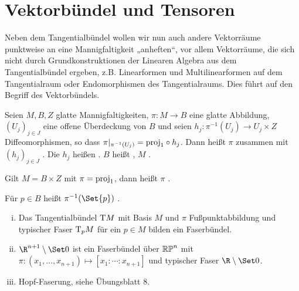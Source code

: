 \chapter{Vektorbündel und Tensoren}


Neben dem Tangentialbündel wollen wir nun auch andere Vektorräume punktweise an eine Mannigfaltigkeit „anheften“, vor allem Vektorräume, die sich nicht durch Grundkonstruktionen der Linearen Algebra aus dem Tangentialbündel ergeben, z.B. Linearformen und Multilinearformen auf dem Tangentialraum oder Endomorphismen des Tangentialraums.
Dies führt auf den Begriff des Vektorbündels.

\begin{df}[Faserbündel] \label{5.1}
    Seien $M, B, Z$ glatte Mannigfaltigkeiten, $\pi: M \to B$ eine glatte Abbildung, $(U_j)_{j\in J}$ eine offene Überdeckung von $B$ und seien
    \begin{math}
        h_j: \pi^{-1}(U_j) \to U_j \times Z
    \end{math}
    Diffeomorphismen, so dass $\pi|_{\pi^{-1}(U_j)} = \mathord{\operatorname{proj}}_1 \circ h_j$.
    Dann heißt $\pi$ zusammen mit $(h_j)_{j\in J}$ .
    Die $h_j$ heißen .
    $B$ heißt , $M$ .

    Gilt $M = B \times Z$ mit $\pi = \mathord{\operatorname{proj}}_1$, dann heißt $\pi$ .

    Für $p \in B$ heißt $\pi^{-1}(\Set{p})$ .
\end{df}

\begin{ex*}
    \begin{enumerate}[(i)]
        \item
            Das Tangentialbündel $\mathrm{T} M$ mit Basis $M$ und $\pi$ Fußpunktabbildung und typischer Faser $\mathrm{T}_p M$ für ein $p \in M$ bilden ein Faserbündel.
        \item
            $\R^{n+1} \setminus \Set 0$ ist ein Faserbündel über $\mathbb{RP}^n$ mit
            \begin{math}
                \pi: (x_1, \dotsc, x_{n+1}) \mapsto [x_1: \dotsb : x_{n+1}]
            \end{math}
            und typischer Faser $\R \setminus \Set 0$.
        \item
            Hopf-Faserung, siehe Übungsblatt 8.
    \end{enumerate}
\end{ex*}

